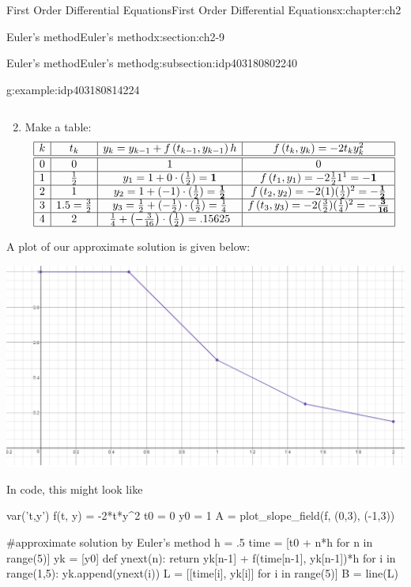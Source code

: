 \documentclass[oneside,10pt,]{book}
\numberwithin{equation}{section}
\numberwithin{equation}{section}
\newcommand{\amp}{&}
\begin{document}
\begin{chapterptx}{First Order Differential Equations}{}{First Order Differential Equations}{}{}{x:chapter:ch2}
\begin{sectionptx}{Euler's method}{}{Euler's method}{}{}{x:section:ch2-9}
\begin{subsectionptx}{Euler's method}{}{Euler's method}{}{}{g:subsection:idp403180802240}
\begin{example}{}{g:example:idp403180814224}
\begin{enumerate}
\begin{equation*}
\end{equation*}
%
\item{}Make a table:%
\begin{equation*}
\begin{array}{|c|c|c|c|}
\hline
k \amp t_{k} \amp y_{k}=y_{k-1}+f\left(t_{k-1},y_{k-1}\right)h \amp f\left(t_{k},y_{k}\right)=-2t_{k}y_{k}^{2}\\
\hline
\hline
0 \amp 0 \amp 1 \amp 0\\
\hline
1 \amp \frac{1}{2} \amp y_{1}=1+0\cdot(\frac{1}{2})=\mathbf{1} \amp f\left(t_{1},y_{1}\right)=-2\frac{1}{2}1^{1}=\mathbf{-1}\\
\hline
2 \amp 1 \amp y_{2}=1+(-1)\cdot(\frac{1}{2})=\mathbf{\frac{1}{2}} \amp f\left(t_{2},y_{2}\right)=-2(1)(\frac{1}{2})^{2}=\mathbf{-\frac{1}{2}}\\
\hline
3 \amp 1.5=\frac{3}{2} \amp y_{3}=\frac{1}{2}+(-\frac{1}{2})\cdot(\frac{1}{2})=\frac{1}{4} \amp f\left(t_{3},y_{3}\right)=-2(\frac{3}{2})(\frac{1}{4})^{2}=\mathbf{-\frac{3}{16}}\\
\hline
4 \amp 2 \amp \frac{1}{4}+\left(-\frac{3}{16}\right)\cdot\left(\frac{1}{2}\right)=.15625 \amp \\
\hline
\end{array}
\end{equation*}
%
\end{enumerate}
A plot of our approximate solution is given below:%
\begin{image}{0}{1}{0}%
\includegraphics[width=\linewidth]{images/1.4-1.png}
\end{image}%
In code, this might look like%
\begin{sageinput}
var('t,y')
f(t, y) = -2*t*y^2
t0 = 0
y0 = 1
A = plot_slope_field(f, (0,3), (-1,3))

#approximate solution by Euler's method
h = .5
time = [t0 + n*h for n in range(5)]
yk = [y0]
def ynext(n):
    return yk[n-1] + f(time[n-1], yk[n-1])*h
for i in range(1,5):
    yk.append(ynext(i))
L = [[time[i], yk[i]] for i in range(5)]
B = line(L)


\end{sageinput}
\end{example}
\end{subsectionptx}
\end{sectionptx}
\end{chapterptx}
\end{document}
